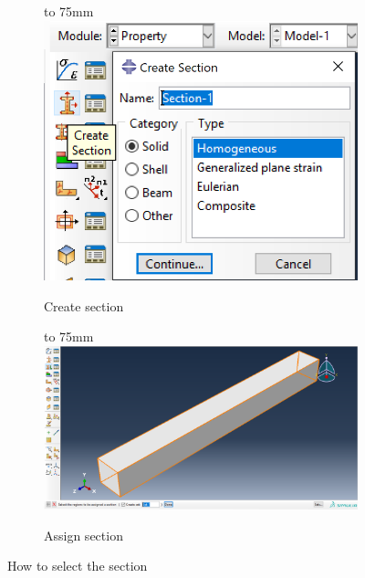 \documentclass[spanish,a4paper,12pt]{article}
\def\imagebox#1#2{\vtop to #1{\null\hbox{#2}\vfill}}
\begin{document}
\begin{figure}[h!tp]
\centering
\captionsetup[subfigure]{justification=centering,singlelinecheck=false}
  \begin{subfigure}[b]{0.20\textwidth}
  \hspace{0mm}
    \imagebox{75mm}{\includegraphics[scale=0.3]{capturas/prop1.png}}
    \caption{Create section\label{fig:bar4a}}
  \end{subfigure}
  \begin{subfigure}[b]{0.79\textwidth}
  \hspace{0mm}
    \imagebox{75mm}{\includegraphics[scale=0.32]{capturas/prop2.png}}
    \caption{Assign section\label{fig:bar4b}}
  \end{subfigure}
\caption{How to select the section}
\label{fig:bar4}
\end{figure}

\clearpage
\end{document}
